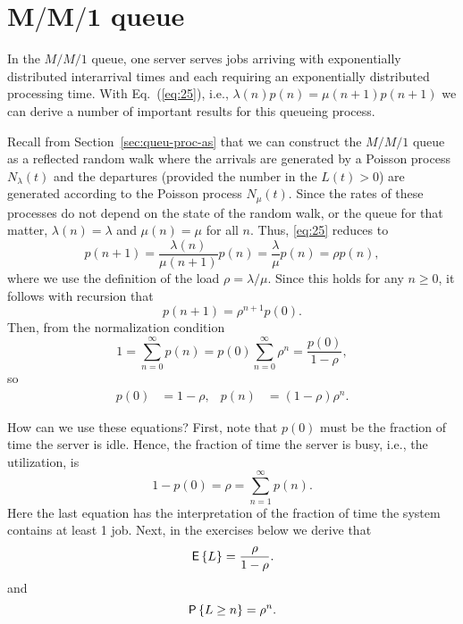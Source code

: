 \section
[$M/M/1$ queue]
{$\mathbf{M/M/1}$ queue}
\label{sec:mm1}


In the $M/M/1$ queue, one server serves jobs arriving with
exponentially distributed interarrival times and each requiring an
exponentially distributed processing time.  With Eq.~(\ref{eq:25}),
i.e., $\lambda(n)p(n)= \mu(n+1)p(n+1)$ we can derive a number of
important results for this queueing process.

Recall from Section~\ref{sec:queu-proc-as} that we can construct the
$M/M/1$ queue as a reflected random walk where the arrivals are
generated by a Poisson process $N_\lambda(t)$ and the departures
(provided the number in the $L(t)>0$) are generated according to the
Poisson process $N_\mu(t)$. Since the rates of these processes do not
depend on the state of the random walk, or the queue for that matter,
$\lambda(n)=\lambda$ and $\mu(n)=\mu$ for all $n$. Thus, \eqref{eq:25}
reduces to
\begin{equation*}
  p(n+1) = \frac{\lambda(n)}{\mu(n+1)} p(n) = \frac{\lambda}{\mu} p(n) = \rho p(n),
\end{equation*}
where we use the definition of the load $\rho=\lambda/\mu$. Since this
holds for any $n\geq 0$, it follows with recursion that
\begin{equation*}
  p(n+1) = \rho^{n+1} p(0).
\end{equation*}
Then, from the normalization condition
\begin{equation*}
1=  \sum_{n=0}^\infty p(n) = p(0)\sum_{n=0}^\infty \rho^n = \frac{p(0)}{1-\rho},
\end{equation*}
so 
\begin{align}\label{eq:23}
p(0) &=1-\rho, &   p(n) &=  (1-\rho)\rho^{n}.
\end{align}

How can we use these equations? First, note that $p(0)$ must be the
fraction of time the server is idle. Hence, the fraction of time the
server is busy, i.e., the utilization, is
\begin{equation*}
  1-p(0) = \rho = \sum_{n=1}^\infty p(n).
\end{equation*}
Here the last equation has the interpretation of the fraction of time
the system contains at least 1 job. Next, in the exercises below we
derive that
\begin{equation}\label{eq:el}
  \,\mathsf{E}\left\{L\right\} = \frac \rho{1-\rho}.
\end{equation}
and 
\begin{equation}\label{eq:pn}
  \P{L\geq n} = \rho^n.
\end{equation}

